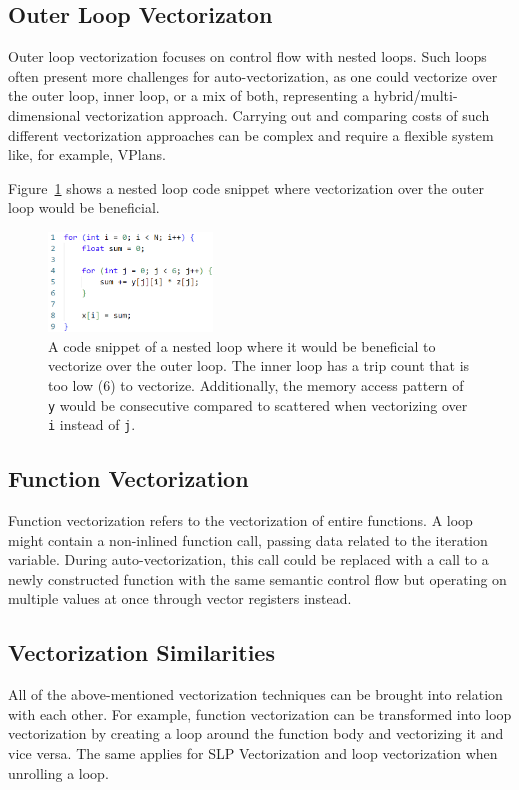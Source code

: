 \documentclass[sigplan,11pt,nonacm]{acmart}
\begin{document}
\subsection{Outer Loop Vectorizaton}
Outer loop vectorization focuses on control flow with nested loops. Such loops often present
more challenges for auto-vectorization, as one could vectorize over the outer loop,
inner loop, or a mix of both, representing a hybrid/multi-dimensional vectorization approach. 
Carrying out and comparing costs of such different vectorization approaches can be complex 
and require a flexible system like, for example, VPlans. 

Figure~\ref{fig:outer-loop-vec} shows a nested loop code snippet where vectorization over the
outer loop would be beneficial.

\begin{figure}
  \centering
  \includegraphics[width=0.39\textwidth]{images/outer-loop-vec.png}
  \caption{A code snippet of a nested loop where it would be beneficial to vectorize over the 
  outer loop. The inner loop has a trip count that is too low (6) to vectorize. Additionally,
  the memory access pattern of \texttt{y} would be consecutive compared to scattered when
  vectorizing over \texttt{i} instead of \texttt{j}.}
  \label{fig:outer-loop-vec}
\end{figure}

\subsection{Function Vectorization}
Function vectorization refers to the vectorization of entire functions. A loop might contain a
non-inlined function call, passing data related to the iteration variable. During auto-vectorization, 
this call could be replaced with a call to a newly constructed function with the same semantic 
control flow but operating on multiple values at once through vector registers instead.

\subsection{Vectorization Similarities}
All of the above-mentioned vectorization techniques can be brought into relation with each other. 
For example, function vectorization can be transformed into loop vectorization by creating a loop 
around the function body and vectorizing it and vice versa. The same applies for SLP Vectorization 
and loop vectorization when unrolling a loop.
 
\end{document}
